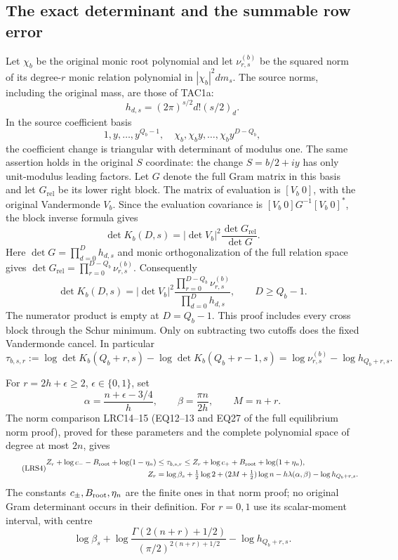 \documentclass[11pt,a4paper]{article}
\begin{document}
\subsection{The exact determinant and the summable row error}

Let $\chi_b$ be the original monic root polynomial and let
$\nu_{r,s}^{(b)}$ be the squared norm of its degree-$r$ monic relation
polynomial in $|\chi_b|^2dm_s$.  The source norms, including the
original mass, are those of TAC1a:
\[
 h_{d,s}=(2\pi)^{s/2}d!(s/2)_d.
\]
In the source coefficient basis
\[
 1,y,\ldots,y^{Q_b-1},\quad
 \chi_b,\chi_by,\ldots,\chi_by^{D-Q_b},
\]
the coefficient change is triangular with determinant of modulus one.
The same assertion holds in the original $S$ coordinate: the change
$S=b/2+iy$ has only unit-modulus leading factors.  Let $G$ denote the
full Gram matrix in this basis and let $G_{\mathrm{rel}}$ be its lower
right block.  The matrix of evaluation is $[V_b\ 0]$, with the
original Vandermonde $V_b$.  Since the evaluation covariance is
$[V_b\ 0]G^{-1}[V_b\ 0]^*$, the block inverse formula gives
\[
 \det K_b(D,s)=|\det V_b|^2\frac{\det G_{\mathrm{rel}}}{\det G}.
\]
Here $\det G=\prod_{d=0}^Dh_{d,s}$ and monic orthogonalization of
the full relation space gives
$\det G_{\mathrm{rel}}=\prod_{r=0}^{D-Q_b}\nu_{r,s}^{(b)}$.
Consequently
\begin{equation}\tag{LRS2}
 \det K_b(D,s)=|\det V_b|^2
 \frac{\prod_{r=0}^{D-Q_b}\nu_{r,s}^{(b)}}
      {\prod_{d=0}^{D}h_{d,s}},\qquad D\ge Q_b-1.
\end{equation}
The numerator product is empty at $D=Q_b-1$.  This proof includes
every cross block through the Schur minimum.  Only on subtracting
two cutoffs does the fixed Vandermonde cancel.  In particular
\begin{equation}\tag{LRS3}
 \tau_{b,s,r}:=\log\det K_b(Q_b+r,s)
              -\log\det K_b(Q_b+r-1,s)
     =\log\nu_{r,s}^{(b)}-\log h_{Q_b+r,s}.
\end{equation}

For $r=2h+\epsilon\ge2$, $\epsilon\in\{0,1\}$, set
\[
 \alpha=\frac{n+\epsilon-3/4}{h},\qquad
 \beta=\frac{\pi n}{2h},\qquad M=n+r.
\]
The norm comparison LRC14--15 (EQ12--13 and EQ27 of the full equilibrium
norm proof), proved for these parameters and the
complete polynomial space of degree at most $2n$, gives
\begin{equation}\tag{LRS4}
\begin{split}
 Z_r+\log c_- -B_{\rm root}+\log(1-\eta_n)
   &\le\tau_{b,s,r}\le
 Z_r+\log c_+ +B_{\rm root}+\log(1+\eta_n),\\
 Z_r&=\log\beta_s+\tfrac12\log2
       +(2M+\tfrac12)\log n-h\lambda(\alpha,\beta)
       -\log h_{Q_b+r,s}.
\end{split}
\end{equation}
The constants $c_\pm,B_{\rm root},\eta_n$ are the finite ones in that
norm proof; no original Gram determinant occurs in their definition.
For $r=0,1$ use its scalar-moment interval, with centre
\[
 \log\beta_s+\log\frac{\Gamma(2(n+r)+1/2)}
                              {(\pi/2)^{2(n+r)+1/2}}
                       -\log h_{Q_b+r,s}.
\]
\end{document}
